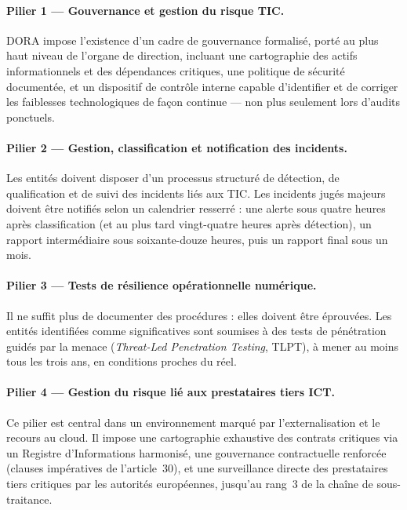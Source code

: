 \documentclass[11pt,a4paper]{article}
\theoremstyle{navystyle}
\theoremstyle{navydef}
\begin{document}
\paragraph{Pilier 1 --- Gouvernance et gestion du risque TIC.} DORA impose
l'existence d'un cadre de gouvernance formalisé, porté au plus haut niveau de
l'organe de direction, incluant une cartographie des actifs informationnels et
des dépendances critiques, une politique de sécurité documentée, et un
dispositif de contrôle interne capable d'identifier et de corriger les
faiblesses technologiques de façon continue --- non plus seulement lors
d'audits ponctuels.

\paragraph{Pilier 2 --- Gestion, classification et notification des incidents.}
Les entités doivent disposer d'un processus structuré de détection, de
qualification et de suivi des incidents liés aux TIC. Les incidents jugés
majeurs doivent être notifiés selon un calendrier resserré : une alerte sous
quatre heures après classification (et au plus tard vingt-quatre heures après
détection), un rapport intermédiaire sous soixante-douze heures, puis un
rapport final sous un mois.

\paragraph{Pilier 3 --- Tests de résilience opérationnelle numérique.} Il ne
suffit plus de documenter des procédures : elles doivent être éprouvées. Les
entités identifiées comme significatives sont soumises à des tests de
pénétration guidés par la menace (\emph{Threat-Led Penetration Testing},
TLPT), à mener au moins tous les trois ans, en conditions proches du réel.

\paragraph{Pilier 4 --- Gestion du risque lié aux prestataires tiers ICT.}
Ce pilier est central dans un environnement marqué par l'externalisation et le
recours au cloud. Il impose une cartographie exhaustive des contrats
critiques via un Registre d'Informations harmonisé, une gouvernance
contractuelle renforcée (clauses impératives de l'article~30), et une
surveillance directe des prestataires tiers critiques par les autorités
européennes, jusqu'au rang~3 de la chaîne de sous-traitance.
\end{document}
